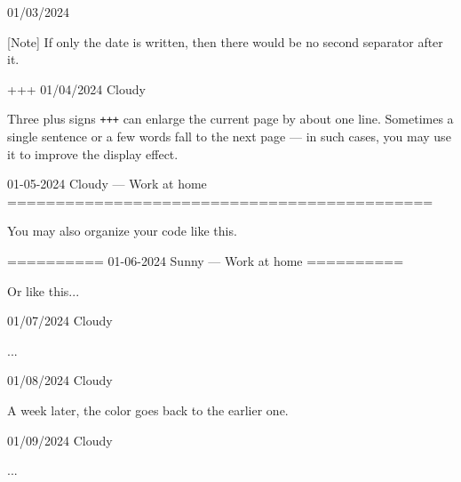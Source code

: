\documentclass[11pt, paperstyle=light yellow, color entry, month-day-year,
  title in boldface, title in sffamily, use style = classical]{jwjournal}
\begin{document}
01/03/2024

  [Note] If only the date is written, then there would be no second separator after it.


+++
01/04/2024  Cloudy

  Three plus signs \texttt{+++} can enlarge the current page by about one line. Sometimes a single sentence or a few words fall to the next page --- in such cases, you may use it to improve the display effect.



01-05-2024    Cloudy        --- Work at home
============================================

You may also organize your code like this.


==========
01-06-2024    Sunny         --- Work at home
==========

Or like this...



01/07/2024  Cloudy

  ...



01/08/2024  Cloudy

  A week later, the color goes back to the earlier one.



01/09/2024  Cloudy

  ...
\end{document}
